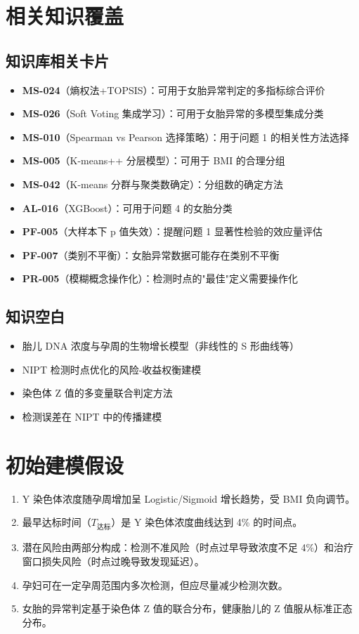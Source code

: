 \documentclass{internal-report}
\begin{document}
\section{相关知识覆盖}

\subsection{知识库相关卡片}

\begin{itemize}
  \item \textbf{MS-024}（熵权法+TOPSIS）：可用于女胎异常判定的多指标综合评价
  \item \textbf{MS-026}（Soft Voting 集成学习）：可用于女胎异常的多模型集成分类
  \item \textbf{MS-010}（Spearman vs Pearson 选择策略）：用于问题 1 的相关性方法选择
  \item \textbf{MS-005}（K-means++ 分层模型）：可用于 BMI 的合理分组
  \item \textbf{MS-042}（K-means 分群与聚类数确定）：分组数的确定方法
  \item \textbf{AL-016}（XGBoost）：可用于问题 4 的女胎分类
  \item \textbf{PF-005}（大样本下 p 值失效）：提醒问题 1 显著性检验的效应量评估
  \item \textbf{PF-007}（类别不平衡）：女胎异常数据可能存在类别不平衡
  \item \textbf{PR-005}（模糊概念操作化）：检测时点的"最佳"定义需要操作化
\end{itemize}

\subsection{知识空白}

\begin{itemize}
  \item 胎儿 DNA 浓度与孕周的生物增长模型（非线性的 S 形曲线等）
  \item NIPT 检测时点优化的风险-收益权衡建模
  \item 染色体 Z 值的多变量联合判定方法
  \item 检测误差在 NIPT 中的传播建模
\end{itemize}

\section{初始建模假设}

\begin{enumerate}
  \item Y 染色体浓度随孕周增加呈 Logistic/Sigmoid 增长趋势，受 BMI 负向调节。
  \item 最早达标时间（$T_{\text{达标}}$）是 Y 染色体浓度曲线达到 4\% 的时间点。
  \item 潜在风险由两部分构成：检测不准风险（时点过早导致浓度不足 4\%）和治疗窗口损失风险（时点过晚导致发现延迟）。
  \item 孕妇可在一定孕周范围内多次检测，但应尽量减少检测次数。
  \item 女胎的异常判定基于染色体 Z 值的联合分布，健康胎儿的 Z 值服从标准正态分布。
\end{enumerate}
\end{document}
